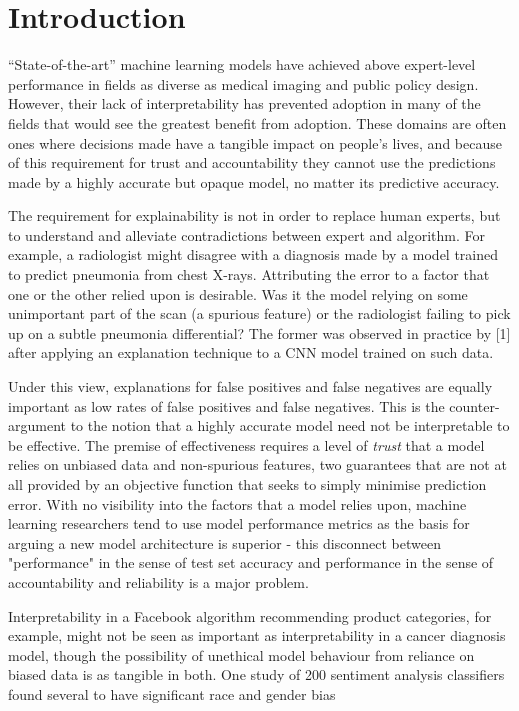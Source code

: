 \documentclass[main]{subfiles}
\begin{document}
\chapter{Introduction}


``State-of-the-art'' machine learning models have achieved above expert-level performance in fields as diverse as medical imaging and public policy design. However, their lack of interpretability has prevented adoption in many of the fields that would see the greatest benefit from adoption. These domains are often ones where decisions made have a tangible impact on people's lives, and because of this requirement for trust and accountability they cannot use the predictions made by a highly accurate but opaque model, no matter its predictive accuracy.

The requirement for explainability is not in order to replace human experts, but to understand and alleviate contradictions between expert and algorithm. For example, a radiologist might disagree with a diagnosis made by a model trained to predict pneumonia from chest X-rays. Attributing the error to a factor that one or the other relied upon is desirable. Was it the model relying on some unimportant part of the scan (a spurious feature) or the radiologist failing to pick up on a subtle pneumonia differential? The former was observed in practice by [1] after applying an explanation technique to a CNN model trained on such data. 

Under this view, explanations for false positives and false negatives are equally important as low rates of false positives and false negatives. This is the counter-argument to the notion that a highly accurate model need not be interpretable to be effective. The premise of effectiveness requires a level of \textit{trust} that a model relies on unbiased data and non-spurious features, two guarantees that are not at all provided by an objective function that seeks to simply minimise prediction error. With no visibility into the factors that a model relies upon, machine learning researchers tend to use model performance metrics as the basis for arguing a new model architecture is superior - this disconnect between "performance" in the sense of test set accuracy and performance in the sense of accountability and reliability is a major problem.

Interpretability in a Facebook algorithm recommending product categories, for example, might not be seen as important as interpretability in a cancer diagnosis model, though the possibility of unethical model behaviour from reliance on biased data is as tangible in both. One study of 200 sentiment analysis classifiers found several to have significant race and gender bias
\end{document}
